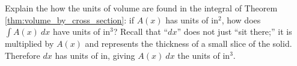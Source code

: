 {Explain the how the units of volume are found in the integral of Theorem \ref{thm:volume_by_cross_section}: if $A(x)$ has units of in$^2$, how does $\int A(x)\ dx$ have units of in$^3$?}
{Recall that ``$dx$'' does not just ``sit there;'' it is multiplied by $A(x)$ and represents the thickness of a small slice of the solid. Therefore $dx$ has units of in, giving $A(x)\ dx$ the units of in$^3$.}

